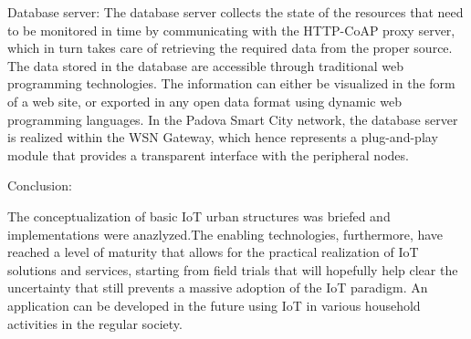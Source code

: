 Database server: The database server collects the state of the resources that need to be monitored in time by communicating with the HTTP-CoAP proxy server, which in turn takes care of retrieving the required data from the proper source. The data stored in the database are accessible through traditional web programming technologies. The information can either be visualized in the form of a web site, or exported in any open data format using dynamic web programming languages. In the Padova Smart City network, the database server is realized within the WSN Gateway, which hence represents a plug-and-play module that provides a transparent interface with the peripheral nodes.



Conclusion:

The conceptualization of basic IoT urban structures was briefed and implementations were anazlyzed.The enabling technologies, furthermore, have reached a level of maturity that allows for the practical realization of IoT solutions and services, starting from field trials that will hopefully help clear the uncertainty that still prevents a massive adoption of the IoT paradigm. An application can be developed in the future using IoT in various household activities in the regular society.
